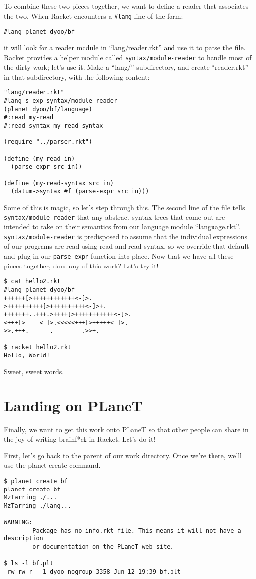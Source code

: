 \documentclass{article}
\begin{document}
To combine these two pieces together, we want to define a reader that
associates the two. When Racket encounters a \verb+#lang+ line of the
form:
\begin{verbatim}
#lang planet dyoo/bf
\end{verbatim}
it will look for a reader module in ``lang/reader.rkt'' and use it to
parse the file.  Racket provides a helper module called
\verb|syntax/module-reader| to handle most of the dirty work; let's use
it. Make a ``lang/'' subdirectory, and create ``reader.rkt'' in that
subdirectory, with the following content:
\begin{verbatim}
"lang/reader.rkt"
#lang s-exp syntax/module-reader
(planet dyoo/bf/language)
#:read my-read
#:read-syntax my-read-syntax
 
(require "../parser.rkt")
 
(define (my-read in)
  (parse-expr src in))
 
(define (my-read-syntax src in)
  (datum->syntax #f (parse-expr src in)))
\end{verbatim}
Some of this is magic, so let's step through this. The second line of
the file tells \verb|syntax/module-reader| that any abstract syntax trees
that come out are intended to take on their semantics from our
language module ``language.rkt''. \verb|syntax/module-reader| is predisposed to
assume that the individual expressions of our programs are read using read and read-syntax, so we
override that default and plug in our \verb|parse-expr| function into place.
Now that we have all these pieces together, does any of this work?
Let's try it!
\begin{verbatim}
$ cat hello2.rkt
#lang planet dyoo/bf
++++++[>++++++++++++<-]>.
>++++++++++[>++++++++++<-]>+.
+++++++..+++.>++++[>+++++++++++<-]>.
<+++[>----<-]>.<<<<<+++[>+++++<-]>.
>>.+++.------.--------.>>+.
 
$ racket hello2.rkt
Hello, World!
\end{verbatim}
Sweet, sweet words.

\section{Landing on PLaneT}
Finally, we want to get this work onto PLaneT so that other people can share in the joy of writing brainf*ck in Racket. Let's do it!

First, let's go back to the parent of our work directory. Once we're there, we'll use the planet create command.
\begin{verbatim}
$ planet create bf
planet create bf
MzTarring ./...
MzTarring ./lang...
 
WARNING:
        Package has no info.rkt file. This means it will not have a description
        or documentation on the PLaneT web site.
 
$ ls -l bf.plt
-rw-rw-r-- 1 dyoo nogroup 3358 Jun 12 19:39 bf.plt
\end{verbatim}
\end{document}
